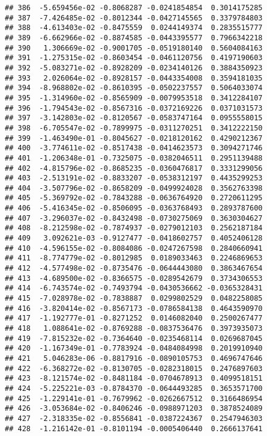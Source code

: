 \documentclass[
]{article}
\begin{document}
\begin{verbatim}
## 386  -5.659456e-02 -0.8068287 -0.0241854854  0.3014175285
## 387  -7.426485e-02 -0.8012344 -0.0427145565  0.3379784803
## 388  -4.613403e-02 -0.8475559  0.0244149374  0.2835515777
## 389  -6.662966e-02 -0.8874585 -0.0443395577  0.7966342218
## 390   1.306669e-02 -0.9001705 -0.0519180140  0.5604084163
## 391  -1.275315e-02 -0.8603454 -0.0461120756  0.4197190603
## 392  -5.083271e-02 -0.8928209 -0.0234140126  0.3884350923
## 393   2.026064e-02 -0.8928157 -0.0443354008  0.3594181035
## 394  -8.968802e-02 -0.8610395 -0.0502237557  0.5064033074
## 395  -1.314960e-02 -0.8565909 -0.0079953518  0.3412284107
## 396  -1.794543e-02 -0.8567316 -0.0372169226  0.0371031573
## 397  -3.142803e-02 -0.8120567 -0.0583747164  0.0955558015
## 398  -6.705547e-02 -0.7899975 -0.0311270251  0.3412222150
## 399  -1.463490e-01 -0.8045627 -0.0218120162  0.4290212367
## 400  -3.774611e-02 -0.8517438 -0.0414623573  0.3094271746
## 401  -1.206348e-01 -0.7325075 -0.0382046511  0.2951139488
## 402  -4.815796e-02 -0.8685235 -0.0360476817  0.3331299056
## 403  -2.513191e-02 -0.8833207 -0.0538312197  0.4435299253
## 404  -3.507796e-02 -0.8658209 -0.0499924028  0.3562763398
## 405  -5.369792e-02 -0.7843288 -0.0636764920  0.2720611295
## 406  -5.416345e-02 -0.8506095 -0.0363768493  0.2893787600
## 407  -3.296037e-02 -0.8432498 -0.0730275069  0.3630304627
## 408  -8.212598e-02 -0.7874937 -0.0279012103  0.2562187184
## 409   3.092621e-03 -0.9127477 -0.0418602757  0.4052406128
## 410  -4.596155e-02 -0.8084086 -0.0247267598  0.2840660941
## 411  -8.774779e-02 -0.8012985  0.0189033463  0.2246869653
## 412  -4.577498e-02 -0.8735476 -0.0644443080  0.3863467654
## 413  -4.689500e-02 -0.8366575 -0.0289542679  0.3734306553
## 414  -6.743574e-02 -0.7493794 -0.0430536662 -0.0365328431
## 415  -7.028978e-02 -0.7838887  0.0299802529  0.0482258085
## 416  -3.820414e-02 -0.8567173 -0.0786584138  0.4643590970
## 417  -1.192777e-01 -0.8271252  0.0146082040  0.2500267477
## 418   1.088641e-02 -0.8769288 -0.0837536476  0.3973935073
## 419  -7.815232e-02 -0.7364640 -0.0235468114  0.0269687045
## 420  -1.167349e-01 -0.7783924 -0.0484084998  0.2019910940
## 421   5.046283e-06 -0.8817916 -0.0890105753  0.4696747646
## 422  -6.368272e-02 -0.8130705 -0.0282318015  0.2476897603
## 423  -8.121574e-02 -0.8481184 -0.0704678913  0.4099518151
## 424  -5.225221e-03 -0.8784370 -0.0644493285  0.3653571700
## 425  -1.229141e-01 -0.7679962 -0.0262667512  0.3166486954
## 426  -3.053684e-02 -0.8406246 -0.0988971203  0.3878524089
## 427  -2.318335e-02 -0.8556841 -0.0387224367  0.2547946303
## 428  -1.216142e-01 -0.8101194 -0.0005406440  0.2666137641

\end{verbatim}
\end{document}
